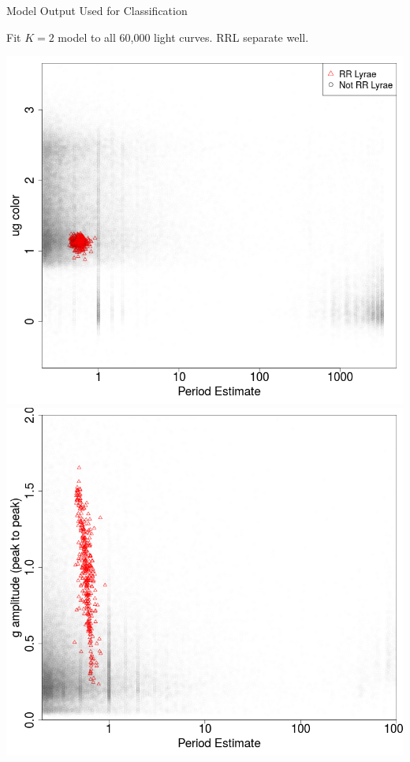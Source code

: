 \documentclass[12pt]{beamer}
\begin{document}
\begin{frame}{Model Output Used for Classification}

  \begin{center}
    Fit $K=2$ model to all 60,000 light curves. RRL separate well.
  \end{center}
  
\begin{center}
  \includegraphics[scale=.2]{figs/sdss_color_period.png}
  \includegraphics[scale=.2]{figs/sdss_gamp_period.png}
\end{center}



\end{frame}
\end{document}
